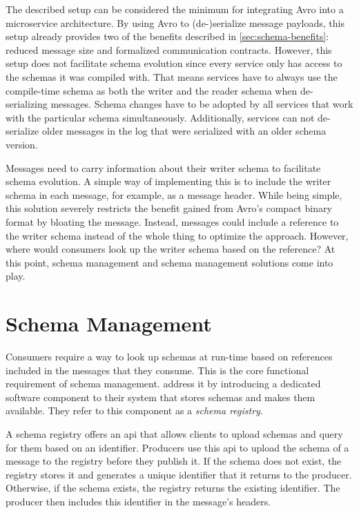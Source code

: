The described setup can be considered the minimum for integrating Avro into a microservice architecture.
By using Avro to (de-)serialize message payloads, this setup already provides two of the benefits described in \ref{sec:schema-benefits}: reduced message size and formalized communication contracts.
However, this setup does not facilitate schema evolution since every service only has access to the schemas it was compiled with.
That means services have to always use the compile-time schema as both the writer and the reader schema when de-serializing messages.
Schema changes have to be adopted by all services that work with the particular schema simultaneously.
Additionally, services can not de-serialize older messages in the log that were serialized with an older schema version.

Messages need to carry information about their writer schema to facilitate schema evolution.
A simple way of implementing this is to include the writer schema in each message, for example, as a message header.
While being simple, this solution severely restricts the benefit gained from Avro's compact binary format by bloating the message.
Instead, messages could include a reference to the writer schema instead of the whole thing to optimize the approach.
However, where would consumers look up the writer schema based on the reference?
At this point, schema management and schema management solutions come into play.

\section{Schema Management}

Consumers require a way to look up schemas at run-time based on references included in the messages that they consume.
This is the core functional requirement of schema management.
\cite{kreps_kafka_2011} address it by introducing a dedicated software component to their system that stores schemas and makes them available.
They refer to this component as a \emph{schema registry}.

A schema registry offers an \gls{api} that allows clients to upload schemas and query for them based on an identifier.
Producers use this \gls{api} to upload the schema of a message to the registry before they publish it.
If the schema does not exist, the registry stores it and generates a unique identifier that it returns to the producer.
Otherwise, if the schema exists, the registry returns the existing identifier.
The producer then includes this identifier in the message's headers.

